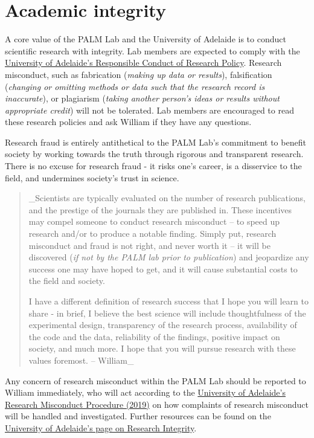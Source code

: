 \documentclass[
]{book}
\begin{document}
\hypertarget{academic-integrity}{%
\section{Academic integrity}\label{academic-integrity}}

A core value of the PALM Lab and the University of Adelaide is to conduct scientific research with integrity. Lab members are expected to comply with the \href{https://www.adelaide.edu.au/policies/96/}{University of Adelaide's Responsible Conduct of Research Policy}. Research misconduct, such as fabrication (\emph{making up data or results}), falsification (\emph{changing or omitting methods or data such that the research record is inaccurate}), or plagiarism (\emph{taking another person's ideas or results without appropriate credit}) will not be tolerated. Lab members are encouraged to read these research policies and ask William if they have any questions.

Research fraud is entirely antithetical to the PALM Lab's commitment to benefit society by working towards the truth through rigorous and transparent research. There is no excuse for research fraud - it risks one's career, is a disservice to the field, and undermines society's trust in science.

\begin{quote}
\_Scientists are typically evaluated on the number of research publications, and the prestige of the journals they are published in. These incentives may compel someone to conduct research misconduct -- to speed up research and/or to produce a notable finding. Simply put, research misconduct and fraud is not right, and never worth it -- it will be discovered (\emph{if not by the PALM lab prior to publication}) and jeopardize any success one may have hoped to get, and it will cause substantial costs to the field and society.

I have a different definition of research success that I hope you will learn to share - in brief, I believe the best science will include thoughtfulness of the experimental design, transparency of the research process, availability of the code and the data, reliability of the findings, positive impact on society, and much more. I hope that you will pursue research with these values foremost. -- William\_
\end{quote}

Any concern of research misconduct within the PALM Lab should be reported to William immediately, who will act according to the \href{https://www.adelaide.edu.au/policies/96/?dsn=policy.document;field=data;id=7885;m=view}{University of Adelaide's Research Misconduct Procedure (2019)} on how complaints of research misconduct will be handled and investigated. Further resources can be found on the \href{https://www.adelaide.edu.au/staff/research/ethics-compliance-integrity/research-integrity}{University of Adelaide's page on Research Integrity}.
\end{document}
